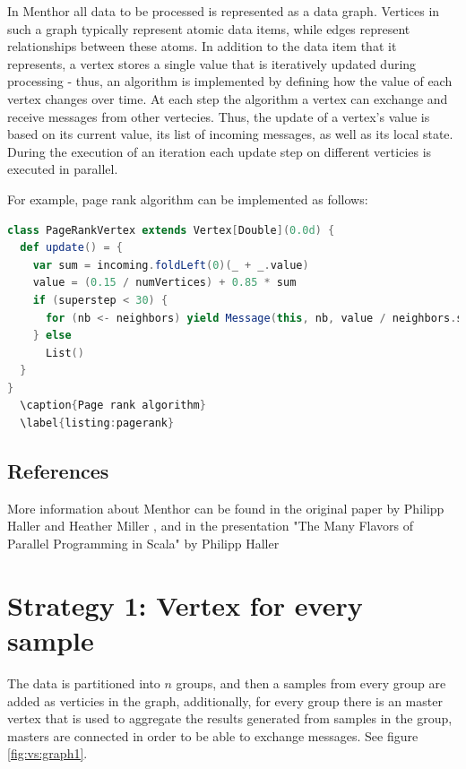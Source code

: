 \documentclass{report}
\begin{document}
In Menthor all data to be processed is represented as a data graph. Vertices in such a graph typically represent atomic data items, while edges represent relationships between these atoms. In addition to the data item that it represents, a vertex stores a
single value that is iteratively updated during processing - thus, an algorithm is implemented by defining how the value of each vertex changes over time. At each step the algorithm a vertex can exchange and receive messages from other vertecies. Thus, the update of a vertex’s value is based on its current value, its list of incoming messages, as well as its local state. During the execution of an iteration each update step on different verticies is executed in parallel.

For example, page rank algorithm can be implemented as follows:

\begin{lstlisting}[language=scala]
class PageRankVertex extends Vertex[Double](0.0d) {
  def update() = {
    var sum = incoming.foldLeft(0)(_ + _.value)
    value = (0.15 / numVertices) + 0.85 * sum
    if (superstep < 30) {
      for (nb <- neighbors) yield Message(this, nb, value / neighbors.size)
    } else
      List()
  }
}
  \caption{Page rank algorithm}
  \label{listing:pagerank}
\end{lstlisting}

\subsection{References}

More information about Menthor can be found in the original paper by Philipp Haller and Heather Miller \cite{oai:infoscience.epfl.ch:165111}, and in the presentation "The Many Flavors of Parallel Programming in Scala" by Philipp Haller \cite{scalaparallel}

\section{Strategy 1: Vertex for every sample}

The data is partitioned into $n$ groups, and then a samples from every group are added as verticies in the graph, additionally, for every group there is an master vertex that is used to aggregate the results generated from samples in the group, masters are connected in order to be able to exchange messages. See figure \ref{fig:vs:graph1}.
\end{document}
